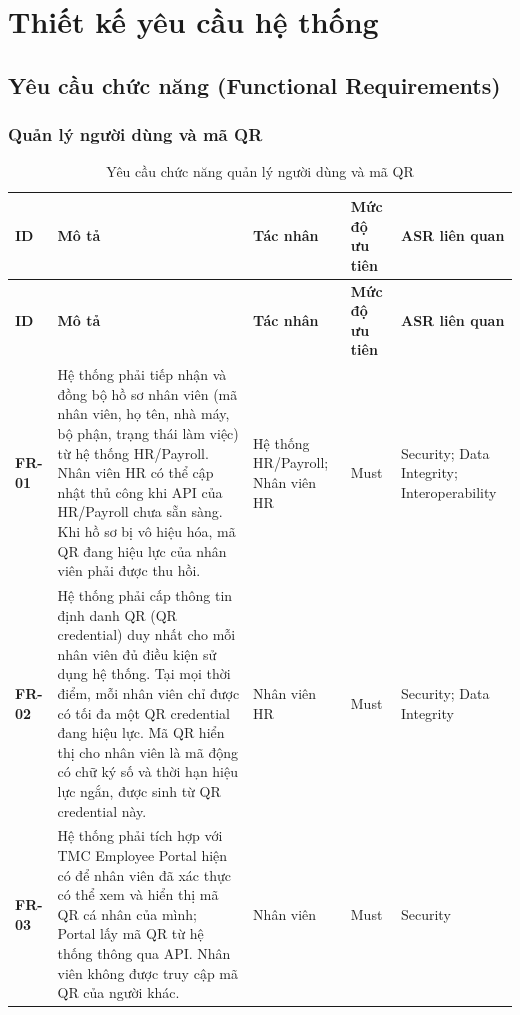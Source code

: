 \section{Thiết kế yêu cầu hệ thống}

\subsection{Yêu cầu chức năng (Functional Requirements)}\label{sec:fr}
\subsubsection{Quản lý người dùng và mã QR}

\begingroup
\small
\renewcommand{\arraystretch}{1.2}
\begin{longtable}{|>{\centering\arraybackslash}m{1.3cm}|>{\raggedright\arraybackslash}m{6.2cm}|>{\raggedright\arraybackslash}m{2.4cm}|>{\centering\arraybackslash}m{1.5cm}|>{\raggedright\arraybackslash}m{3.5cm}|}
    \caption{Yêu cầu chức năng quản lý người dùng và mã QR}\label{tab:functional-requirements-qr}\\
    \hline
    \textbf{ID} & \textbf{Mô tả} & \textbf{Tác nhân} & \textbf{Mức độ ưu tiên} & \textbf{ASR liên quan}\\
    \hline
    \endfirsthead
    \hline
    \textbf{ID} & \textbf{Mô tả} & \textbf{Tác nhân} & \textbf{Mức độ ưu tiên} & \textbf{ASR liên quan}\\
    \hline
    \endhead
    \hline
    \endfoot
    \hline
    \endlastfoot
    \textbf{FR-01} & Hệ thống phải tiếp nhận và đồng bộ hồ sơ nhân viên (mã nhân viên, họ tên, nhà máy, bộ phận, trạng thái làm việc) từ hệ thống HR/Payroll. Nhân viên HR có thể cập nhật thủ công khi API của HR/Payroll chưa sẵn sàng. Khi hồ sơ bị vô hiệu hóa, mã QR đang hiệu lực của nhân viên phải được thu hồi. & Hệ thống HR/Payroll; Nhân viên HR & Must & Security; Data Integrity; Interoperability\\
    \hline
    \textbf{FR-02} & Hệ thống phải cấp thông tin định danh QR (QR credential) duy nhất cho mỗi nhân viên đủ điều kiện sử dụng hệ thống. Tại mọi thời điểm, mỗi nhân viên chỉ được có tối đa một QR credential đang hiệu lực. Mã QR hiển thị cho nhân viên là mã động có chữ ký số và thời hạn hiệu lực ngắn, được sinh từ QR credential này. & Nhân viên HR & Must & Security; Data Integrity\\
    \hline
    \textbf{FR-03} & Hệ thống phải tích hợp với TMC Employee Portal hiện có để nhân viên đã xác thực có thể xem và hiển thị mã QR cá nhân của mình; Portal lấy mã QR từ hệ thống thông qua API. Nhân viên không được truy cập mã QR của người khác. & Nhân viên & Must & Security\\

\end{longtable}
